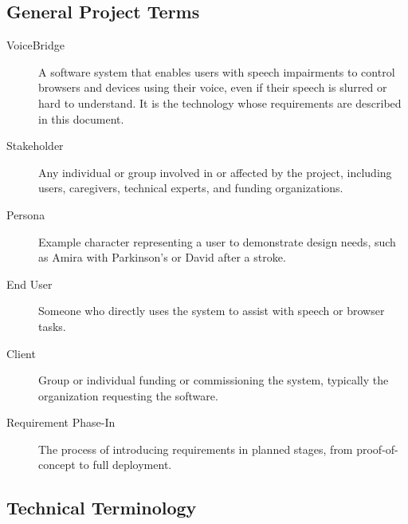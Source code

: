 \documentclass[11pt]{article}
\begin{document}
\subsection*{General Project Terms}

\begin{description}
  \item[VoiceBridge] A software system that enables users with speech impairments to control browsers and devices using their voice, even if their speech is slurred or hard to understand. It is the technology whose requirements are described in this document.
  \item[Stakeholder] Any individual or group involved in or affected by the project, including users, caregivers, technical experts, and funding organizations.
  \item[Persona] Example character representing a user to demonstrate design needs, such as Amira with Parkinson’s or David after a stroke.
  \item[End User] Someone who directly uses the system to assist with speech or browser tasks.
  \item[Client] Group or individual funding or commissioning the system, typically the organization requesting the software.
  \item[Requirement Phase-In] The process of introducing requirements in planned stages, from proof-of-concept to full deployment.
\end{description}

\subsection*{Technical Terminology}
\end{document}
